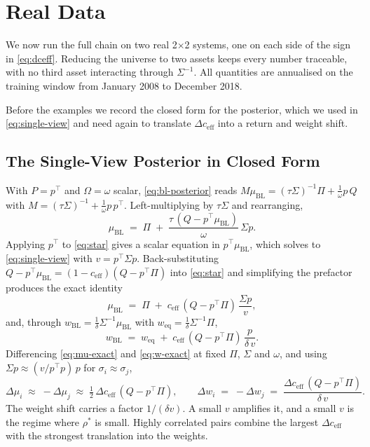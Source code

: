 \documentclass[a4paper,11pt]{article}
\theoremstyle{plain}
\theoremstyle{definition}
\newcommand{\muBL}{\mu_{\mathrm{BL}}}
\newcommand{\eff}{\mathrm{eff}}
\begin{document}
\section{Real Data}
\label{sec:real}

We now run the full chain on two real 2$\times$2 systems, one on each side of the
sign in \eqref{eq:dceff}. Reducing the universe to two assets keeps every number
traceable, with no third asset interacting through $\Sigma^{-1}$. All quantities
are annualised on the training window from January 2008 to December 2018.

Before the examples we record the closed form for the posterior, which we used in
\eqref{eq:single-view} and need again to translate $\Delta c_{\eff}$ into a return
and weight shift.

\subsection{The Single-View Posterior in Closed Form}
\label{sec:dmu-dw}

With $P = p^\top$ and $\Omega = \omega$ scalar, \eqref{eq:bl-posterior} reads
$M\muBL = (\tau\Sigma)^{-1}\Pi + \tfrac{1}{\omega}p\,Q$ with
$M = (\tau\Sigma)^{-1} + \tfrac{1}{\omega}p\,p^\top$. Left-multiplying by
$\tau\Sigma$ and rearranging,
\begin{equation}
\label{eq:star}
  \muBL \;=\; \Pi \;+\; \frac{\tau\,(Q - p^\top\muBL)}{\omega}\,\Sigma p .
\end{equation}
Applying $p^\top$ to \eqref{eq:star} gives a scalar equation in $p^\top\muBL$,
which solves to \eqref{eq:single-view} with $v = p^\top\Sigma p$. Back-substituting
$Q - p^\top\muBL = (1 - c_{\eff})(Q - p^\top\Pi)$ into \eqref{eq:star} and
simplifying the prefactor produces the exact identity
\begin{equation}
\label{eq:mu-exact}
  \muBL \;=\; \Pi \;+\; c_{\eff}\,(Q - p^\top\Pi)\,\frac{\Sigma p}{v} ,
\end{equation}
and, through $w_{\mathrm{BL}} = \tfrac{1}{\delta}\Sigma^{-1}\muBL$ with
$w_{\mathrm{eq}} = \tfrac{1}{\delta}\Sigma^{-1}\Pi$,
\begin{equation}
\label{eq:w-exact}
  w_{\mathrm{BL}} \;=\; w_{\mathrm{eq}}
  \;+\; c_{\eff}\,(Q - p^\top\Pi)\,\frac{p}{\delta\,v} .
\end{equation}
Differencing \eqref{eq:mu-exact} and \eqref{eq:w-exact} at fixed $\Pi$, $\Sigma$
and $\omega$, and using $\Sigma p \approx (v / p^\top p)\,p$ for $\sigma_i \approx \sigma_j$,
\begin{equation}
\label{eq:deltas}
  \Delta\mu_i \;\approx\; -\Delta\mu_j \;\approx\; \tfrac{1}{2}\,\Delta c_{\eff}\,(Q - p^\top\Pi),
  \qquad
  \Delta w_i \;=\; -\Delta w_j \;=\; \frac{\Delta c_{\eff}\,(Q - p^\top\Pi)}{\delta\,v} .
\end{equation}
The weight shift carries a factor $1/(\delta v)$. A small $v$ amplifies it, and a
small $v$ is the regime where $\rho^*$ is small. Highly correlated pairs combine
the largest $\Delta c_{\eff}$ with the strongest translation into the weights.
\end{document}
